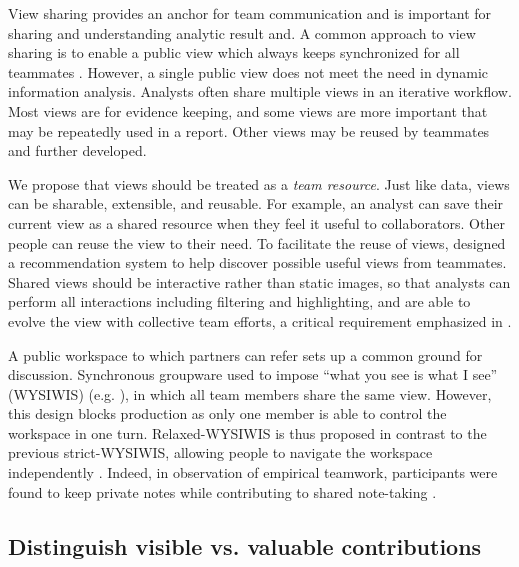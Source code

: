 View sharing provides an anchor for team communication and is important for sharing and understanding analytic result
\citep{Morton2014a} and. A common approach to view sharing is to enable a public view which always
keeps synchronized for all teammates \citep{Convertino2011,Greenberg1990}.
However, a single public view does not meet the need in dynamic information analysis.
Analysts often share multiple views in an iterative workflow. Most views are for evidence keeping, and some views are more important that may be repeatedly used in a report. Other views may be reused by teammates and further developed.

We propose that views should be treated as a \emph{team resource}. Just
like data, views can be sharable, extensible, and reusable. For example, an analyst
can save their current view as a shared resource when they feel it useful to
collaborators. Other people can reuse the view to their need. To facilitate the reuse of views, \cite{Nobarany2012} designed a recommendation system to help discover possible useful views from teammates. Shared views
should be interactive rather than static images, so that analysts can perform
all interactions including filtering and highlighting, and are able to evolve
the view with collective team efforts, a critical requirement emphasized in
\cite{Carroll2013}.

A public workspace to
which partners can refer sets up a common ground for discussion. Synchronous
groupware used to impose “what you see is what I see” (WYSIWIS) (e.g. \cite{stefik1987wysiwis}),  in which all team members share the same view. However, this design
blocks production as only one member is able to control the workspace in one
turn. Relaxed-WYSIWIS is thus proposed in contrast to the previous
strict-WYSIWIS, allowing people to navigate the workspace independently \citep{Gutwin1998h}. 
Indeed, in observation of empirical teamwork, participants
were found to keep private notes while contributing to shared note-taking \citep{Borge2012}.

\subsection{Distinguish visible vs. valuable contributions}

